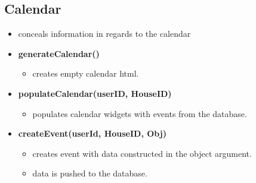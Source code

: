 \documentclass[12pt]{article}
\begin{document}
\subsection{Calendar}
\begin{itemize}
  \item conceals information in regards to the calendar
  \item \textbf{generateCalendar()}
    \begin{itemize}
    \item creates empty calendar html.
    \end{itemize}
  \item \textbf{populateCalendar(userID, HouseID)}
    \begin{itemize}
    \item populates calendar widgets with events from the database.
    \end{itemize}
  \item \textbf{createEvent(userId, HouseID, Obj)}
    \begin{itemize}
    \item creates event with data constructed in the object argument.
    \item data is pushed to the database.
    \end{itemize}
\end{itemize}
\end{document}
